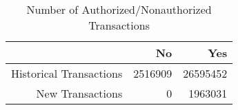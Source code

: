 \begin{table}[ht]
\centering
\begin{tabular}{rrr}
  
 & No & Yes \\ 
  \hline
Historical Transactions & 2516909 & 26595452 \\ 
  New Transactions & 0 & 1963031 \\ 
   \hline
\end{tabular}
\caption{Number of Authorized/Nonauthorized Transactions}
\end{table}
